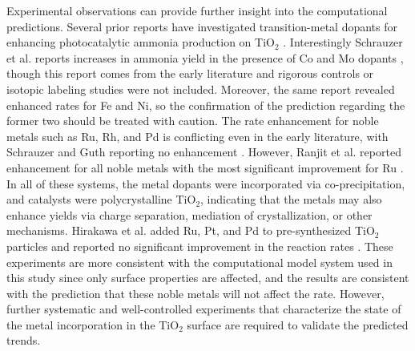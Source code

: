 Experimental observations can provide further insight into the computational predictions. Several prior reports have investigated transition-metal dopants for enhancing photocatalytic ammonia production on TiO$_2$ \cite{Schrauzer_1977, Ranjit_1996, Hirakawa_2017}. Interestingly Schrauzer et al. reports increases in ammonia yield in the presence of Co and Mo dopants \cite{Schrauzer_1977}, though this report comes from the early literature and rigorous controls \cite{Greenlee_2018} or isotopic labeling studies \cite{Andersen_2019} were not included. Moreover, the same report revealed enhanced rates for Fe and Ni, so the confirmation of the prediction regarding the former two should be treated with caution. The rate enhancement for noble metals such as Ru, Rh, and Pd is conflicting even in the early literature, with Schrauzer and Guth reporting no enhancement \cite{Schrauzer_1977}. However, Ranjit et al. reported enhancement for all noble metals with the most significant improvement for Ru \cite{Ranjit_1996}. In all of these systems, the metal dopants were incorporated via co-precipitation, and catalysts were polycrystalline TiO$_2$, indicating that the metals may also enhance yields via charge separation, mediation of crystallization, or other mechanisms\cite{Medford_2017}. Hirakawa et al. added Ru, Pt, and Pd to pre-synthesized TiO$_2$ particles and reported no significant improvement in the reaction rates \cite{Hirakawa_2017}. These experiments are more consistent with the computational model system used in this study since only surface properties are affected, and the results are consistent with the prediction that these noble metals will not affect the rate. However, further systematic and well-controlled experiments that characterize the state of the metal incorporation in the TiO$_2$ surface are required to validate the predicted trends.








